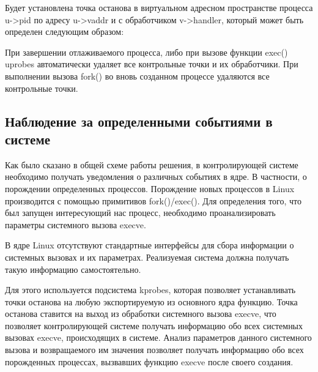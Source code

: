 

Будет установлена точка останова в виртуальном адресном пространстве 
процесса u->pid по адресу u->vaddr и с обработчиком v->handler, который
 может быть определен следующим образом: 



При завершении отлаживаемого процесса, либо при вызове функции exec() 
uprobes автоматически удаляет все контрольные точки и их обработчики. 
При выполнении вызова fork() во вновь созданном процессе удаляются все 
контрольные точки. 

\subsection{Наблюдение за определенными событиями в системе}

Как было сказано в общей схеме работы решения, в контролирующей
системе необходимо получать уведомления о различных событиях в
ядре. В частности, о порождении определенных процессов.
Порождение новых процессов в Linux производится с помощью
примитивов fork()/exec(). Для определения того, что был запущен
интересующий нас процесс, необходимо проанализировать параметры
системного вызова execve.

В ядре Linux отсутствуют стандартные интерфейсы для сбора
информации о системных вызовах и их параметрах.
Реализуемая система должна получать такую информацию самостоятельно.

Для этого используется подсистема kprobes, которая
позволяет устанавливать точки останова на любую экспортируемую из
основного ядра функцию. Точка останова ставится на выход из обработки
системного вызова execve, что позволяет контролирующей системе получать
информацию обо всех системных вызовах execve, происходящих в системе.
Анализ параметров данного системного вызова и возвращаемого им значения
позволяет получать информацию обо всех порожденных процессах, вызвавших
функцию execve после своего создания.

